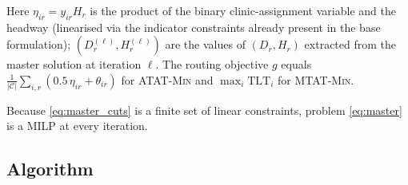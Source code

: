 Here $\eta_{ir} = y_{ir} H_r$ is the product of the binary
clinic-assignment variable and the headway (linearised via the
indicator constraints already present in the base formulation);
$(D_r^{(\ell)}, H_r^{(\ell)})$ are the values of $(D_r, H_r)$
extracted from the master solution at iteration $\ell$.  The routing
objective $g$ equals $\frac{1}{|\mathcal{C}|}\sum_{i,r}
(0.5\,\eta_{ir}+\theta_{ir})$ for \textsc{ATAT-Min} and $\max_{i}
\text{TLT}_i$ for \textsc{MTAT-Min}.

Because \eqref{eq:master_cuts} is a finite set of linear constraints,
problem \eqref{eq:master} is a MILP at every iteration.

\subsection{Algorithm}


